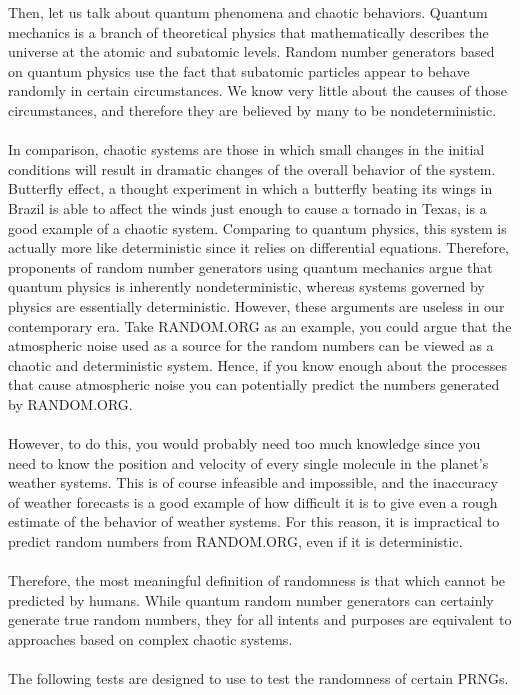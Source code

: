 \documentclass[12pt]{article}
\begin{document}
Then, let us talk about quantum phenomena and chaotic behaviors. Quantum mechanics is a branch of theoretical physics that mathematically describes the universe at the atomic and subatomic levels. Random number generators based on quantum physics use the fact that subatomic particles appear to behave randomly in certain circumstances. We know very little about the causes of those circumstances, and therefore they are believed by many to be nondeterministic.\\\\
In comparison, chaotic systems are those in which small changes in the initial conditions will result in dramatic changes of the overall behavior of the system. Butterfly effect, a thought experiment in which a butterfly beating its wings in Brazil is able to affect the winds just enough to cause a tornado in Texas, is a good example of a chaotic system. Comparing to quantum physics, this system is actually more like deterministic since it relies on differential equations.
Therefore, proponents of random number generators using quantum mechanics argue that quantum physics is inherently nondeterministic, whereas systems governed by physics are essentially deterministic. However, these arguments are useless in our contemporary era. Take RANDOM.ORG as an example, you could argue that the atmospheric noise used as a source for the random numbers can be viewed as a chaotic and deterministic system. Hence, if you know enough about the processes that cause atmospheric noise you can potentially predict the numbers generated by RANDOM.ORG.\\\\
However, to do this, you would probably need too much knowledge since you need to know the position and velocity of every single molecule in the planet's weather systems. This is of course infeasible and impossible, and the inaccuracy of weather forecasts is a good example of how difficult it is to give even a rough estimate of the behavior of weather systems. For this reason, it is impractical to predict random numbers from RANDOM.ORG, even if it is deterministic.\\\\
Therefore, the most meaningful definition of randomness is that which cannot be predicted by humans. While quantum random number generators can certainly generate true random numbers, they for all intents and purposes are equivalent to approaches based on complex chaotic systems.\\\\
The following tests are designed to use to test the randomness of certain PRNGs.\\
\end{document}
